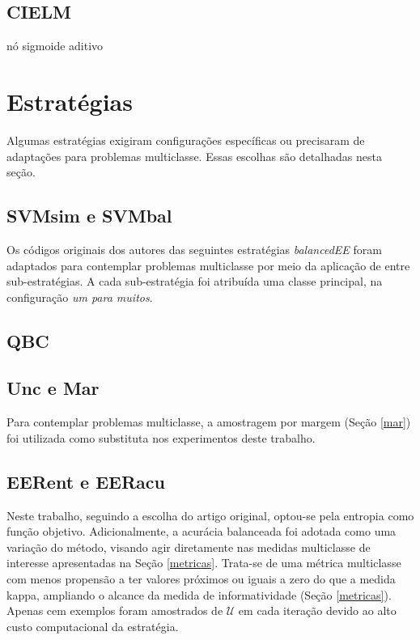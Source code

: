 \subsection{CIELM}
nó sigmoide aditivo


\section{Estratégias}
Algumas estratégias exigiram configurações específicas ou precisaram de adaptações para
problemas multiclasse.
Essas escolhas são detalhadas nesta seção.

\subsection{SVMsim e SVMbal}
Os códigos originais dos autores das seguintes estratégias \textit{balancedEE}
foram adaptados para contemplar problemas multiclasse por meio da aplicação de
 entre sub-estratégias.
A cada sub-estratégia foi atribuída uma classe principal,
na configuração \textit{um para muitos}.

\subsection{QBC}

\subsection{Unc e Mar}
Para contemplar problemas multiclasse,
a amostragem por margem (Seção \ref{mar}) foi utilizada como substituta
nos experimentos deste trabalho.

\subsection{EERent e EERacu}
Neste trabalho, seguindo a escolha do artigo original,
optou-se pela entropia como função objetivo.
Adicionalmente, a acurácia balanceada foi adotada como uma variação do método,
visando agir diretamente nas medidas multiclasse de interesse apresentadas na
Seção \ref{metricas}.
Trata-se de uma métrica multiclasse com menos propensão a ter valores próximos
ou iguais a zero do que a medida kappa, ampliando o alcance da medida de
informatividade (Seção \ref{metricas}).
Apenas cem exemplos foram amostrados de $\mathcal{U}$ em cada iteração devido ao
alto custo computacional da estratégia.

